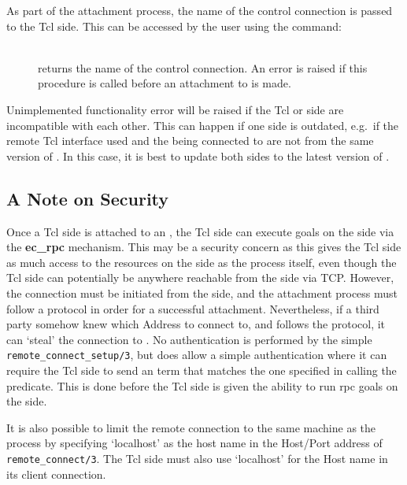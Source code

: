 As part of the attachment process, the {\eclipse} name of the control
connection  is passed to the Tcl side. This can be accessed by the user
using the command:

\begin{description}
\item[]\ \\ returns the {\eclipse} name of the control
connection. An error is raised if this procedure is called before
an attachment to {\eclipse} is made.
\end{description}

Unimplemented functionality error will be raised if the Tcl or
{\eclipse} side are incompatible with each other. This can happen if
one side is outdated, e.g.\ if the remote Tcl interface used and the {\eclipse}
being connected to are not from the same version of {\eclipse}. In this
case, it is best to update both sides to the latest version of {\eclipse}.

\subsection{A Note on Security}

Once a Tcl side is attached to an {\eclipse}, the Tcl side can execute 
{\eclipse} goals on the {\eclipse} side via the {\bf ec_rpc} mechanism. This 
may be a security concern as
this gives the Tcl side as much access to the resources on the {\eclipse}
side as the {\eclipse} process itself, even though the Tcl side can
potentially be anywhere reachable from the {\eclipse} side via TCP.
However, the connection must be initiated from the {\eclipse} side, and the
attachment process must follow a protocol in order for a successful
attachment. Nevertheless,
if a third party somehow knew which Address to connect to, and follows the
protocol, it can `steal' the connection to {\eclipse}. No
authentication is performed by the simple \verb'remote_connect_setup/3',
but  does allow a simple authentication
where it can require the Tcl side to send an {\eclipse} term that matches
the one specified in calling the predicate. This is done before the Tcl
side is given the ability to run rpc goals on the {\eclipse} side. 

It is also possible to limit the remote connection to the same machine as the
{\eclipse} process by specifying `localhost' as the host name in the
Host/Port address of \verb'remote_connect/3'. The Tcl side must also
use `localhost' for the Host name in its client connection. 

